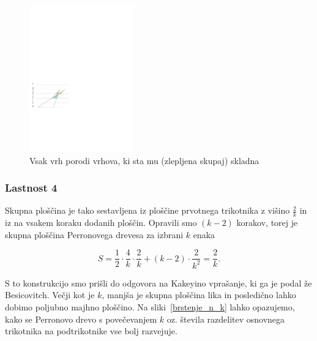 \documentclass[a4paper, 12pt]{article}
\begin{document}
\begin{figure}[h!]
    \centering
    \includegraphics[width=0.4\textwidth]{ipe_slike/novi_vrhovi.pdf}
    \caption{Vsak vrh porodi vrhova, ki sta mu (zlepljena skupaj) skladna}
    \label{vrhovi}
\end{figure}


\subsubsection*{Lastnost 4}

Skupna ploščina je tako sestavljena iz ploščine prvotnega trikotnika z višino $ \frac{2}{k} $ in iz na vsakem koraku dodanih ploščin. Opravili smo $ (k-2) $ korakov, torej je skupna ploščina Perronovega drevesa za izbrani $ k $ enaka

\begin{equation*}
    S = \frac{1}{2} \cdot \frac{4}{k} \cdot \frac{2}{k}  + (k -2) \cdot \frac{2}{k^2} = \frac{2}{k}.
\end{equation*}

S to konstrukcijo smo prišli do odgovora na Kakeyino vprašanje, ki ga je podal že Besicovitch. Večji kot je $ k $, manjša je skupna ploščina lika in posledično lahko dobimo poljubno majhno ploščino. Na sliki~\ref{brstenje_n_k} lahko opazujemo, kako se Perronovo drevo s povečevanjem $ k $ oz. števila razdelitev osnovnega trikotnika na podtrikotnike vse bolj razvejuje.
\end{document}
